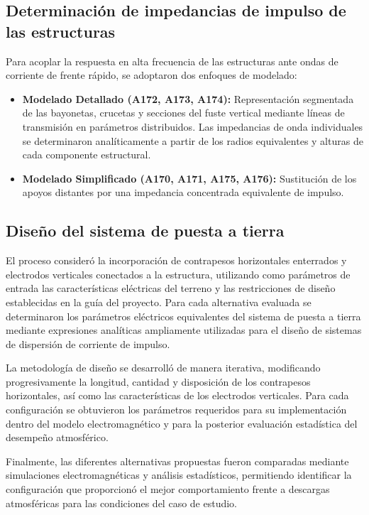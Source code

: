 \documentclass[12pt,letterpaper]{article}
\begin{document}
\subsection{Determinación de impedancias de impulso de las estructuras}
Para acoplar la respuesta en alta frecuencia de las estructuras ante ondas de corriente de frente rápido, se adoptaron dos enfoques de modelado:
\begin{itemize}
    \item \textbf{Modelado Detallado (\textsc{A172}, \textsc{A173}, \textsc{A174}):} Representación segmentada de las bayonetas, crucetas y secciones del fuste vertical mediante líneas de transmisión en parámetros distribuidos. Las impedancias de onda individuales se determinaron analíticamente a partir de los radios equivalentes y alturas de cada componente estructural.
    \item \textbf{Modelado Simplificado (\textsc{A170}, \textsc{A171}, \textsc{A175}, \textsc{A176}):} Sustitución de los apoyos distantes por una impedancia concentrada equivalente de impulso.
\end{itemize}


\subsection{Diseño del sistema de puesta a tierra}

El proceso consideró la incorporación de contrapesos horizontales enterrados y electrodos verticales conectados a la estructura, utilizando como parámetros de entrada las características eléctricas del terreno y las restricciones de diseño establecidas en la guía del proyecto. Para cada alternativa evaluada se determinaron los parámetros eléctricos equivalentes del sistema de puesta a tierra mediante expresiones analíticas ampliamente utilizadas para el diseño de sistemas de dispersión de corriente de impulso.

La metodología de diseño se desarrolló de manera iterativa, modificando progresivamente la longitud, cantidad y disposición de los contrapesos horizontales, así como las características de los electrodos verticales. Para cada configuración se obtuvieron los parámetros requeridos para su implementación dentro del modelo electromagnético y para la posterior evaluación estadística del desempeño atmosférico.

Finalmente, las diferentes alternativas propuestas fueron comparadas mediante simulaciones electromagnéticas y análisis estadísticos, permitiendo identificar la configuración que proporcionó el mejor comportamiento frente a descargas atmosféricas para las condiciones del caso de estudio.
\end{document}
